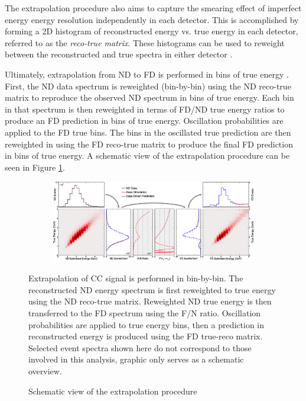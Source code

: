 The extrapolation procedure also aims to capture the smearing effect of
imperfect energy energy resolution independently in each detector.
This is accomplished by forming a 2D histogram of reconstructed energy
vs. true energy in each detector, referred to as the \textit{reco-true matrix}.
These histograms can be used to reweight between the reconstructed
and true spectra in either detector \cite{lozier2015extrap}.

Ultimately, extrapolation from ND to FD is performed in bins of true energy
\cite{lozier2015extrap}.
First, the ND data spectrum is reweighted (bin-by-bin)
using the ND reco-true matrix
to reproduce the observed ND spectrum in bins of true energy.
Each bin in that spectrum is then reweighted in terms of FD/ND true energy
ratios to
produce an FD prediction in bins of true energy.
Oscillation probabilities are applied to the FD true bins.
The bins in the
oscillated true prediction are then reweighted in using the FD reco-true
matrix to produce the final FD prediction in bins of true energy.
A schematic view of the extrapolation procedure can be seen in Figure
\ref{extrap_fig}.

\begin{figure}
\begin{center}
  \begin{subfigure}[b]{\textwidth}
    \centering
    \includegraphics[height=0.39\textwidth]{figures/figures/extrap_schematic.png}
  \end{subfigure}
\end{center}
\caption{Schematic view of the extrapolation procedure}{
Extrapolation of \numu CC signal is performed in bin-by-bin.
The reconstructed ND energy spectrum is first reweighted to true energy
using the ND reco-true matrix.
Reweighted ND true energy is then transferred to the FD spectrum using the
F/N ratio.
Oscillation probabilities are applied to true energy bins,
then a prediction in reconstructed energy is produced using the
FD true-reco matrix.
Selected event spectra shown here do not correspond to those
involved in this analysis, graphic only serves as a schematic overview.
}
\label{extrap_fig}
\end{figure}

